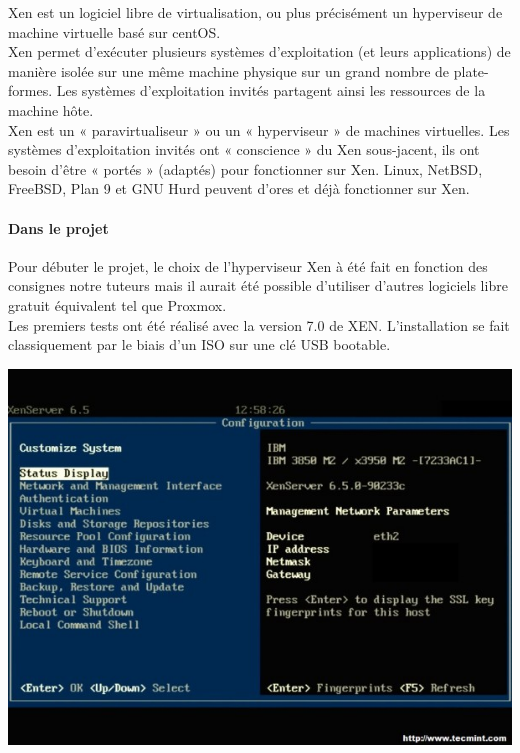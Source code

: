 \documentclass[a4paper,12pt]{article}
\begin{document}
Xen est un logiciel libre de virtualisation, ou plus précisément un hyperviseur de machine virtuelle basé sur centOS.\\

Xen permet d'exécuter plusieurs systèmes d'exploitation (et leurs applications) de manière isolée sur une même machine physique sur un grand nombre de plate-formes. Les systèmes d'exploitation invités partagent ainsi les ressources de la machine hôte.\\

Xen est un « paravirtualiseur » ou un « hyperviseur » de machines virtuelles. Les systèmes d'exploitation invités ont « conscience » du Xen sous-jacent, ils ont besoin d'être « portés » (adaptés) pour fonctionner sur Xen. Linux, NetBSD, FreeBSD, Plan 9 et GNU Hurd peuvent d'ores et déjà fonctionner sur Xen.\\

\paragraph{Dans le projet\\}

Pour débuter le projet, le choix de l’hyperviseur Xen à été fait en fonction des consignes notre tuteurs mais il aurait été possible d’utiliser d’autres logiciels libre gratuit équivalent tel que Proxmox. \\
Les premiers tests ont été réalisé avec la version 7.0 de XEN. L’installation se fait classiquement par le biais d’un ISO sur une clé USB bootable.

\includegraphics{xenserver18}\\
\end{document}

